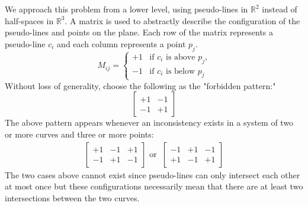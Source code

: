 \documentclass{NSF}
\begin{document}
We approach this problem from a lower level, using pseudo-lines in $\mathbb{R}^2$ instead of half-spaces in $\mathbb{R}^3$. A matrix is used to abstractly describe the configuration of the pseudo-lines and points on the plane. Each row of the matrix represents a pseudo-line $c_i$ and each column represents a point $p_j$. 
\begin{equation*}
M_{ij} =\begin{cases}
            	+1 & \text{if $c_i$ is above $p_j$,} \\
                -1 & \text{if $c_i$ is below $p_j$}
            \end{cases}
\end{equation*}
Without loss of generality, choose the following as the "forbidden pattern:" 
\begin{equation}
\begin{bmatrix}
    +1 & -1 \\
    -1 & +1 
\end{bmatrix}
\end{equation}
The above pattern appears whenever an inconsistency exists in a system of two or more curves and three or more points:
\begin{align*}
\begin{bmatrix}
    +1 & -1 & +1 \\
    -1 & +1 & -1
\end{bmatrix} \text{ or }\ 
\begin{bmatrix}
    -1 & +1 & -1  \\
    +1 & -1 & +1
\end{bmatrix}
\end{align*}
The two cases above cannot exist since pseudo-lines can only intersect each other at most once but these configurations necessarily mean that there are at least two intersections between the two curves. 
\end{document}
